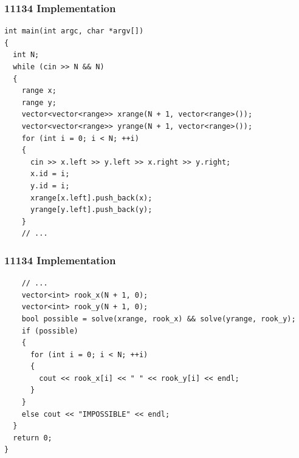 \documentclass{beamer}
\begin{document}
\begin{frame}[containsverbatim]
\frametitle{11134 Implementation}
\scriptsize
\begin{lstlisting}
int main(int argc, char *argv[])
{
  int N;
  while (cin >> N && N)
  {
    range x;
    range y;
    vector<vector<range>> xrange(N + 1, vector<range>());
    vector<vector<range>> yrange(N + 1, vector<range>());
    for (int i = 0; i < N; ++i)
    {
      cin >> x.left >> y.left >> x.right >> y.right;
      x.id = i;
      y.id = i;
      xrange[x.left].push_back(x);
      yrange[y.left].push_back(y);
    }
    // ...
\end{lstlisting}

\end{frame}

\begin{frame}[containsverbatim]
\frametitle{11134 Implementation}
\scriptsize
\begin{lstlisting}
    // ...
    vector<int> rook_x(N + 1, 0);
    vector<int> rook_y(N + 1, 0);
    bool possible = solve(xrange, rook_x) && solve(yrange, rook_y);
    if (possible)
    {
      for (int i = 0; i < N; ++i)
      {
        cout << rook_x[i] << " " << rook_y[i] << endl;
      }
    }
    else cout << "IMPOSSIBLE" << endl;
  }
  return 0;
}
\end{lstlisting}

\end{frame}

\fi






\end{document}
